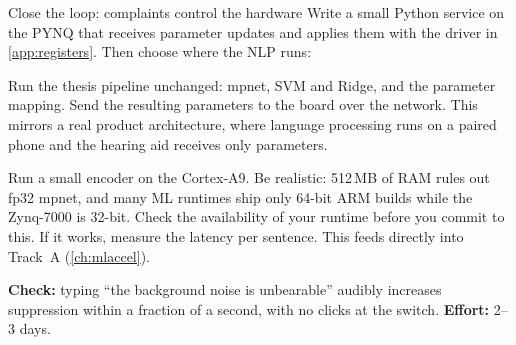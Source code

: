 \begin{stepbox}[label=st:fpga:control]{Close the loop: complaints control the hardware}
Write a small Python service on the PYNQ that receives parameter updates and
applies them with the driver in \cref{app:registers}. Then choose where the NLP
runs:
\begin{description}[style=nextline,leftmargin=1.2em]
  \item[Option A (recommended first): NLP on your laptop]
  Run the thesis pipeline unchanged: mpnet, SVM and Ridge, and the parameter
  mapping. Send the resulting parameters to the board over the network. This
  mirrors a real product architecture, where language processing runs on a
  paired phone and the hearing aid receives only parameters.
  \item[Option B (stretch): NLP on the board]
  Run a small encoder on the Cortex-A9. Be realistic: 512\,MB of RAM rules out
  fp32 mpnet, and many ML runtimes ship only 64-bit ARM builds while the
  Zynq-7000 is 32-bit. Check the availability of your runtime before you
  commit to this. If it works, measure the latency per sentence. This feeds
  directly into Track~A (\cref{ch:mlaccel}).
\end{description}

\textbf{Check:} typing \enquote{the background noise is unbearable} audibly
increases suppression within a fraction of a second, with no clicks at the
switch. \textbf{Effort:} 2--3 days.
\end{stepbox}

